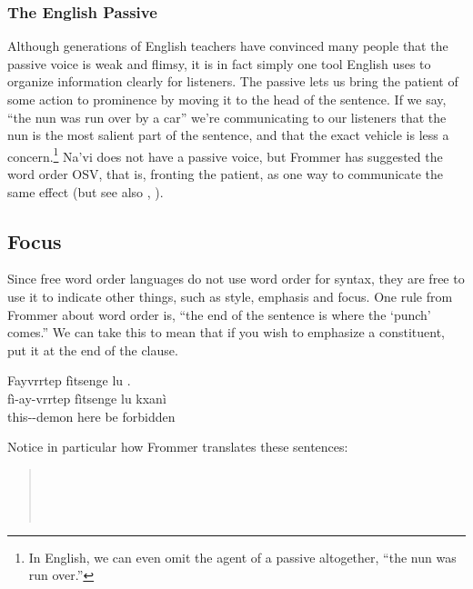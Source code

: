 \subsubsection{The English Passive} Although generations of English
teachers have convinced many people that the passive voice is weak and
flimsy, it is in fact simply one tool English uses to organize
information clearly for listeners.  The
passive lets us bring the patient of some action to prominence by
moving it to the head of the sentence.  If we say, ``the nun was run
over by a car'' we're communicating to our listeners that the nun is
the most salient part of the sentence, and that the exact vehicle is
less a concern.\footnote{In English, we can even omit the agent of a
passive altogether, ``the nun was run over.''}  Na'vi does not have a
passive voice, but Frommer has suggested the word order OSV, that is,
fronting the patient, as one way to communicate the same effect (but
see also , ).



\subsection{Focus} 
Since free word order languages do not use word order for syntax, they
are free to use it to indicate other things, such as style, emphasis
and focus.  One rule from Frommer about word order is, ``the end of
the sentence is where the `punch' comes.''  We can take this to mean
that if you wish to emphasize a constituent, put it at the end of the
clause.

\begin{interlin}
\glll Fayvrrtep fìtsenge lu . \\
      fì-ay-vrrtep fìtsenge lu kxanì \\
      this--demon here be forbidden \\
\Ifilm
\end{interlin}

\noindent Notice in particular how Frommer translates these sentences:

\begin{quotation}
\noindent{}\\
\indent{}\\

\noindent{}\\
\indent{}
\end{quotation}

